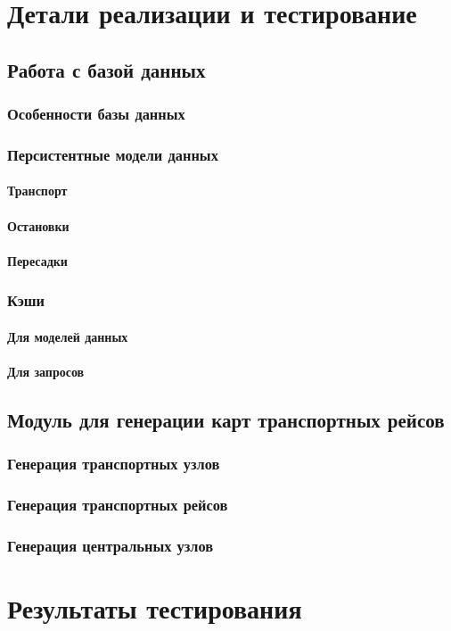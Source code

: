 \chapter{Детали реализации и тестирование}

\section{Работа с базой данных}
\subsection{Особенности базы данных}
\subsection{Персистентные модели данных}
\subsubsection{Транспорт}
\subsubsection{Остановки}
\subsubsection{Пересадки}
\subsection{Кэши}
\subsubsection{Для моделей данных}
\subsubsection{Для запросов}
\section{Модуль для генерации карт транспортных рейсов}
\subsection{Генерация транспортных узлов}
\subsection{Генерация транспортных рейсов}
\subsection{Генерация центральных узлов}
\chapterconclusion

\chapter{Результаты тестирования}
\chapterconclusion
